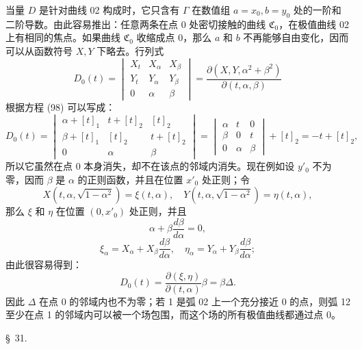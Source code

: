 \documentclass[11pt,a4paper,leqno]{article}
\begin{document}
当量 $D$ 是针对曲线 02 构成时，它只含有 $\Gamma$ 在数值组 $a=x_0,b=y_0$ 处的一阶和二阶导数。由此容易推出：任意两条在点 0 处密切接触的曲线 $\mathfrak C_0$，在极值曲线 02 上有相同的焦点。如果曲线 $\mathfrak C_0$ 收缩成点 0，那么 $a$ 和 $b$ 不再能够自由变化，因而可以从函数符号 $X,Y$ 下略去。行列式
\[
D_0(t)=
\begin{vmatrix}
X_t&X_{\alpha}&X_{\beta}\\
Y_t&Y_{\alpha}&Y_{\beta}\\
0&\alpha&\beta
\end{vmatrix}
=\frac{\partial(X,Y,\alpha^2+\beta^2)}{\partial(t,\alpha,\beta)}
\]
根据方程 (98) 可以写成：
\[
D_0(t)=
\begin{vmatrix}
\alpha+[t]_1&t+[t]_2&[t]_2\\
\beta+[t]_1&[t]_2&t+[t]_2\\
0&\alpha&\beta
\end{vmatrix}
=\begin{vmatrix}
\alpha&t&0\\
\beta&0&t\\
0&\alpha&\beta
\end{vmatrix}+[t]_2=-t+[t]_2,
\]
所以它虽然在点 0 本身消失，却不在该点的邻域内消失。现在例如设 $y'_0$ 不为零，因而 $\beta$ 是 $\alpha$ 的正则函数，并且在位置 $x'_0$ 处正则；令
\[
X(t,\alpha,\sqrt{1-\alpha^2})=\xi(t,\alpha),
\quad
Y(t,\alpha,\sqrt{1-\alpha^2})=\eta(t,\alpha),
\]
那么 $\xi$ 和 $\eta$ 在位置 $(0,x'_0)$ 处正则，并且
\[
\alpha+\beta\frac{d\beta}{d\alpha}=0,
\]
\[
\xi_{\alpha}=X_{\alpha}+X_{\beta}\frac{d\beta}{d\alpha},
\quad
\eta_{\alpha}=Y_{\alpha}+Y_{\beta}\frac{d\beta}{d\alpha};
\]
由此很容易得到：
\[
D_0(t)=\frac{\partial(\xi,\eta)}{\partial(t,\alpha)}\beta=\beta\Delta.
\]
因此 $\Delta$ 在点 0 的邻域内也不为零；若 1 是弧 02 上一个充分接近 0 的点，则弧 12 至少在点 1 的邻域内可以被一个场包围，而这个场的所有极值曲线都通过点 0。

\begin{center}{\large \S~31.}\end{center}
\end{document}

